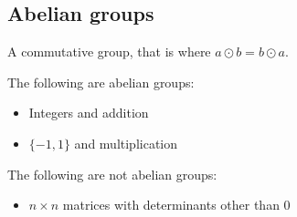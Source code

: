 
\subsection{Abelian groups}

A commutative group, that is where \(a\odot b=b\odot a\).

The following are abelian groups:

\begin{itemize}
\item Integers and addition
\item \(\{-1, 1\}\) and multiplication
\end{itemize}

The following are not abelian groups:

\begin{itemize}
\item \(n\times n\) matrices with determinants other than \(0\)
\end{itemize}

